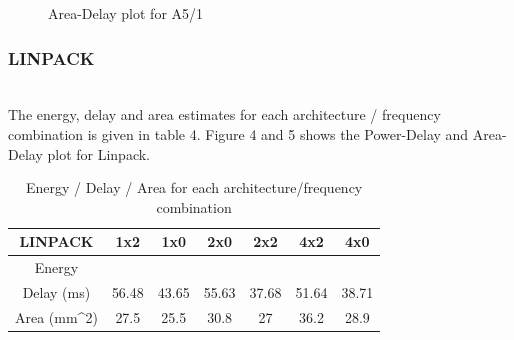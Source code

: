 \documentclass[a4paper, twoside]{article}      %
\begin{document}
\begin{figure}[h!]
{\centering {} \par}
\caption{Area-Delay plot for A5/1}
\end{figure}


\subsubsection{LINPACK}
\\
The energy, delay and area estimates for each architecture / frequency combination is given in table 4.
Figure 4 and 5 shows the Power-Delay and Area-Delay plot for Linpack.

\begin{table}[h!]
\caption{Energy / Delay / Area for each architecture/frequency combination}
\begin{center}
{\begin{tabular}{|c | c |  c |  c  | c  |  c |  c|}
\hline
LINPACK &1x2 &1x0 &2x0 &2x2 &4x2 &4x0 \\ [1ex]
\hline
Energy &&&&&& \\ [1ex]
\hline
Delay (ms)& 56.48& 43.65& 55.63& 37.68& 51.64& 38.71\\[1ex] \hline
Area (mm^2)& 27.5& 25.5& 30.8& 27& 36.2& 28.9\\[1ex]
\hline

\end{tabular}}
\label{diffstruc}
\end{center}
\end{table}
\end{document}

